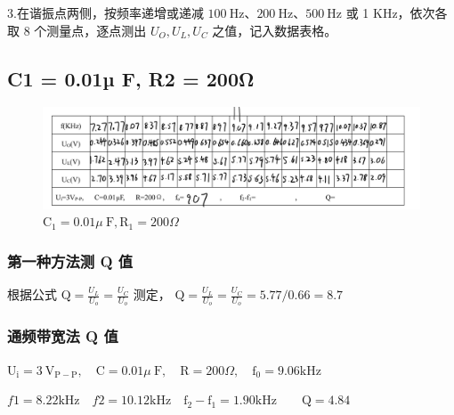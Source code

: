\documentclass{article}
\begin{document}
3.在谐振点两侧，按频率递增或递减 $100 \mathrm{~Hz} 、 200 \mathrm{~Hz} 、 500 \mathrm{~Hz}$ 或 1 KHz，依次各取 8 个测量点，逐点测出 $U_O, U_L, U_C$ 之值，记入数据表格。
\subsection{C1 = 0.01µ F, R2 = 200Ω}

\begin{figure}[H]
    \centering
    \includegraphics[width=\textwidth]{img4.png}
    \caption{ $\mathrm{C}_1=0.01 \mu \mathrm{~F}, \mathrm{R}_1=200 \Omega$}
    \label{fig:diff_circuit}
\end{figure}

\subsubsection{第一种方法测 Q 值}
根据公式 $\mathrm{Q}=\frac{U_L}{U_o}=\frac{U_C}{U_o}$ 测定， $\mathrm{Q}=\frac{U_L}{U_o}=\frac{U_C}{U_o}=5.77/0.66=8.7$
\subsubsection{通频带宽法 Q 值}
$\mathrm{U}_{\mathrm{i}}=3 \mathrm{~V}_{\mathrm{P}-\mathrm{P}}, \quad \mathrm{C}=0.01 \mu \mathrm{~F}, \quad \mathrm{R}=200\Omega, \quad \mathrm{f}_0=9.06 \mathrm{k}  \mathrm{Hz}$

$f1 = 8.22 \mathrm{kHz}\quad f2 = 10.12\mathrm{kHz} \quad \mathrm{f}_2-\mathrm{f}_1=1.90\mathrm{kHz}\quad \quad \mathrm{Q}= 4.84$
\end{document}
